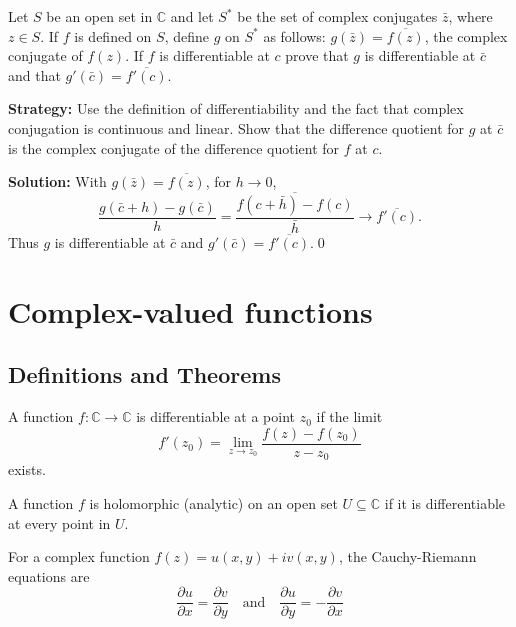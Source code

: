\begin{problembox}
Let \( S \) be an open set in \( \mathbb{C} \) and let \( S^* \) be the set of complex conjugates \( \bar{z} \), where \( z \in S \). If \( f \) is defined on \( S \), define \( g \) on \( S^* \) as follows: \( g(\bar{z}) = \overline{f(z)} \), the complex conjugate of \( f(z) \). If \( f \) is differentiable at \( c \) prove that \( g \) is differentiable at \( \bar{c} \) and that \( g'(\bar{c}) = \overline{f'(c)} \).
\end{problembox}

\noindent\textbf{Strategy:} Use the definition of differentiability and the fact that complex conjugation is continuous and linear. Show that the difference quotient for \( g \) at \( \bar{c} \) is the complex conjugate of the difference quotient for \( f \) at \( c \).

\bigskip\noindent\textbf{Solution:}
With $g(\bar z)=\overline{f(z)}$, for $h\to 0$,
\[\frac{g(\bar c+h)-g(\bar c)}{h}=\overline{\frac{f(c+\bar h)-f(c)}{\bar h}}\to \overline{f'(c)}.\]
Thus $g$ is differentiable at $\bar c$ and $g'(\bar c)=\overline{f'(c)}$.\qed

\section{Complex-valued functions}

\subsection*{Definitions and Theorems}

\begin{definition}
A function $f: \mathbb{C} \to \mathbb{C}$ is differentiable at a point $z_0$ if the limit
\[ f'(z_0) = \lim_{z \to z_0} \frac{f(z) - f(z_0)}{z - z_0} \]
exists.
\end{definition}

\begin{definition}
A function $f$ is holomorphic (analytic) on an open set $U \subseteq \mathbb{C}$ if it is differentiable at every point in $U$.
\end{definition}

\begin{definition}
For a complex function $f(z) = u(x,y) + iv(x,y)$, the Cauchy-Riemann equations are
\[ \frac{\partial u}{\partial x} = \frac{\partial v}{\partial y} \quad \text{and} \quad \frac{\partial u}{\partial y} = -\frac{\partial v}{\partial x} \]
\end{definition}

